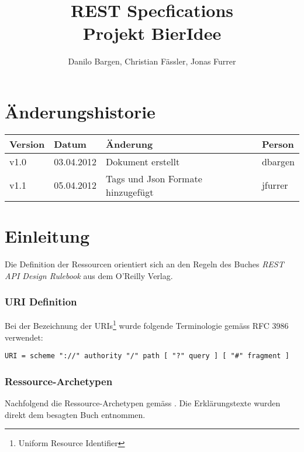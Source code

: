 \documentclass[10pt,a4paper]{scrartcl}
\author{Danilo Bargen, Christian Fässler, Jonas Furrer}
\title{REST Specfications\\Projekt BierIdee}
\let\textquotedbl="
\begin{document}
\begin{titlepage}
	\maketitle
	\vspace{120mm}
	\thispagestyle{empty} %
\end{titlepage}

\newpage
	\tableofcontents
\newpage

\section*{Änderungshistorie}
\begin{tabular}{p{}p{}p{}p{}}
\toprule
\textbf{Version} & \textbf{Datum} & \textbf{Änderung} & \textbf{Person} \\  
\midrule
v1.0 & 03.04.2012 & Dokument erstellt & dbargen \\  
\hline 
v1.1 & 05.04.2012 & Tags und Json Formate hinzugefügt & jfurrer \\
\bottomrule
\end{tabular} 
\newpage


\section{Einleitung}

Die Definition der Ressourcen orientiert sich an den Regeln des Buches
\textit{REST API Design Rulebook} \cite{masse2011rest} aus dem O'Reilly Verlag.

\subsubsection*{URI Definition}

Bei der Bezeichnung der URIs\footnote{Uniform Resource Identifier} wurde folgende Terminologie gemäss RFC 3986 verwendet:

\texttt{URI = scheme \textquotedbl ://\textquotedbl{} authority \textquotedbl /\textquotedbl{}
path [ \textquotedbl ?\textquotedbl{} query ] [ \textquotedbl \#\textquotedbl{} fragment ]}

\subsubsection*{Ressource-Archetypen}

Nachfolgend die Ressource-Archetypen gemäss \cite{masse2011rest}. Die Erklärungstexte wurden direkt dem besagten
Buch entnommen.
\end{document}
